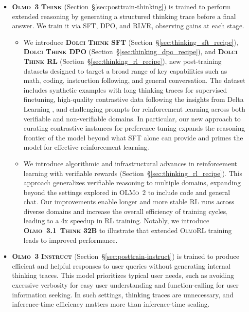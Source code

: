 \documentclass[table]{ai2style/ai2}
\newcommand{\oldOlmo}{OLMo\xspace}
\newcommand{\newOlmo}{Olmo\xspace}
\newcommand{\olmotoo}{\textsc{\oldOlmo~2}\xspace}
\newcommand{\olmothreeinstruct}{\textsc{\newOlmo~3 Instruct}\xspace}
\newcommand{\olmothreerl}{\textsc{\newOlmo{}RL}\xspace}
\newcommand{\olmothreeonethink}{\textsc{\newOlmo~3.1~Think}\xspace}
\newcommand{\olmothreethinking}{\textsc{Olmo~3 Think}\xspace}
\newcommand{\dolcithinksft}{\textsc{Dolci Think SFT}\xspace}
\newcommand{\dolcithinkdpo}{\textsc{Dolci Think DPO}\xspace}
\newcommand{\dolcithinkrl}{\textsc{Dolci Think RL}\xspace}
\begin{document}
\begin{itemize}
\item {\bf \olmothreethinking{}} (Section~\S\ref{sec:posttrain-thinking}) is trained to perform extended reasoning by generating a structured thinking trace before a final answer. We train it via SFT, DPO, and RLVR, observing gains at each stage.

\begin{itemize}[itemsep=2pt]
    \item[$\circ$] We introduce {\bf\dolcithinksft} (Section~\S\ref{sec:thinking_sft_recipe}), {\bf\dolcithinkdpo} (Section~\S\ref{sec:thinking_dpo_recipe}), and {\bf\dolcithinkrl} (Section~\S\ref{sec:thinking_rl_recipe}), new post-training datasets designed to target a broad range of key capabilities such as math, coding, instruction following, and general conversation.
    The dataset includes synthetic examples with long thinking traces for supervised finetuning, high-quality contrastive data following the insights from Delta Learning \citep{geng2025delta}, and challenging prompts for reinforcement learning across both verifiable and non-verifiable domains. In particular, our new approach to curating contrastive instances for preference tuning expands the reasoning frontier of the model beyond what SFT alone can provide and primes the model for effective reinforcement learning.
    \item[$\circ$] We introduce algorithmic and infrastructural advances in reinforcement learning with verifiable rewards (Section~\S\ref{sec:thinking_rl_recipe}). This approach generalizes verifiable reasoning to multiple domains, expanding beyond the settings explored in \olmotoo{} to include code and general chat. Our improvements enable longer and more stable RL runs across diverse domains and increase the overall efficiency of training cycles, leading to a 4x speedup in RL training. Notably, we introduce {\bf \olmothreeonethink 32B} to illustrate that extended \olmothreerl training leads to improved performance.
\end{itemize}
\item {\bf \olmothreeinstruct{}} (Section~\S\ref{sec:posttrain-instruct}) is trained to produce efficient and helpful responses to user queries without generating internal thinking traces. This model prioritizes typical user needs, such as avoiding excessive verbosity for easy user understanding and function-calling for user information seeking.
In such settings, thinking traces are unnecessary, and inference-time efficiency matters more than inference-time scaling.

\end{itemize}
\end{document}
